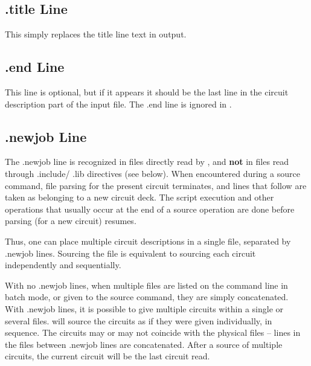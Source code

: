 \subsection{{\vt .title} Line}

This simply replaces the title line text in output.

\subsection{{\vt .end} Line}

This line is optional, but if it appears it should be the last line in
the circuit description part of the input file.  The {\vt .end} line
is ignored in {\WRspice}.

\subsection{{\vt .newjob} Line}

The {\vt .newjob} line is recognized in files directly read by
{\WRspice}, and {\bf not} in files read through {\vt .include}/{\vt
.lib} directives (see below).  When encountered during a {\cb source}
command, file parsing for the present circuit terminates, and lines
that follow are taken as belonging to a new circuit deck.  The script
execution and other operations that usually occur at the end of a {\cb
source} operation are done before parsing (for a new circuit) resumes.

Thus, one can place multiple circuit descriptions in a single file,
separated by {\vt .newjob} lines.  Sourcing the file is equivalent to
sourcing each circuit independently and sequentially.

With no {\vt .newjob} lines, when multiple files are listed on the
command line in batch mode, or given to the {\cb source} command, they
are simply concatenated.  With {\vt .newjob} lines, it is possible to
give multiple circuits within a single or several files.  {\WRspice}
will source the circuits as if they were given individually, in
sequence.  The circuits may or may not coincide with the physical
files -- lines in the files between {\vt .newjob} lines are
concatenated.  After a {\cb source} of multiple circuits, the current
circuit will be the last circuit read.

